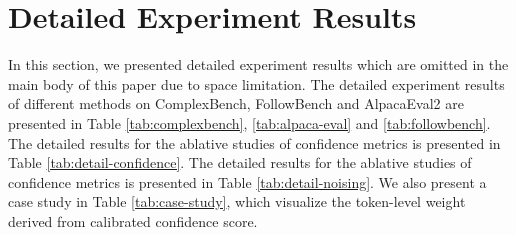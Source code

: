 



\section{Detailed Experiment Results}
\label{sec:app-results}
In this section, we presented detailed experiment results which are omitted in the main body of this paper due to space limitation. The detailed experiment results of different methods on ComplexBench, FollowBench and AlpacaEval2 are presented in Table \ref{tab:complexbench}, \ref{tab:alpaca-eval} and \ref{tab:followbench}. The detailed results for the ablative studies of confidence metrics is presented in Table \ref{tab:detail-confidence}. The detailed results for the ablative studies of confidence metrics is presented in Table \ref{tab:detail-noising}. We also present a case study in Table \ref{tab:case-study}, which visualize the token-level weight derived from calibrated confidence score.


